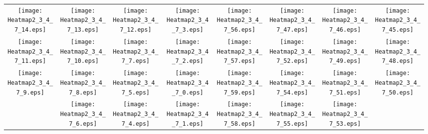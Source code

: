 \documentclass{standalone}
\begin{document}
\begin{tabular}{ *8{c} }
\texttt{[image: Heatmap2\_3\_4\_7\_14.eps]} & \texttt{[image: Heatmap2\_3\_4\_7\_13.eps]} & \texttt{[image: Heatmap2\_3\_4\_7\_12.eps]} & \texttt{[image: Heatmap2\_3\_4\_7\_3.eps]} & \texttt{[image: Heatmap2\_3\_4\_7\_56.eps]} & \texttt{[image: Heatmap2\_3\_4\_7\_47.eps]} & \texttt{[image: Heatmap2\_3\_4\_7\_46.eps]} & \texttt{[image: Heatmap2\_3\_4\_7\_45.eps]} \\
\texttt{[image: Heatmap2\_3\_4\_7\_11.eps]} & \texttt{[image: Heatmap2\_3\_4\_7\_10.eps]} & \texttt{[image: Heatmap2\_3\_4\_7\_7.eps]} & \texttt{[image: Heatmap2\_3\_4\_7\_2.eps]} & \texttt{[image: Heatmap2\_3\_4\_7\_57.eps]} & \texttt{[image: Heatmap2\_3\_4\_7\_52.eps]} & \texttt{[image: Heatmap2\_3\_4\_7\_49.eps]} & \texttt{[image: Heatmap2\_3\_4\_7\_48.eps]} \\
\texttt{[image: Heatmap2\_3\_4\_7\_9.eps]} & \texttt{[image: Heatmap2\_3\_4\_7\_8.eps]} & \texttt{[image: Heatmap2\_3\_4\_7\_5.eps]} & \texttt{[image: Heatmap2\_3\_4\_7\_0.eps]} & \texttt{[image: Heatmap2\_3\_4\_7\_59.eps]} & \texttt{[image: Heatmap2\_3\_4\_7\_54.eps]} & \texttt{[image: Heatmap2\_3\_4\_7\_51.eps]} & \texttt{[image: Heatmap2\_3\_4\_7\_50.eps]} \\
 & \texttt{[image: Heatmap2\_3\_4\_7\_6.eps]} & \texttt{[image: Heatmap2\_3\_4\_7\_4.eps]} & \texttt{[image: Heatmap2\_3\_4\_7\_1.eps]} & \texttt{[image: Heatmap2\_3\_4\_7\_58.eps]} & \texttt{[image: Heatmap2\_3\_4\_7\_55.eps]} & \texttt{[image: Heatmap2\_3\_4\_7\_53.eps]} &  
\end{tabular}
\end{document}
